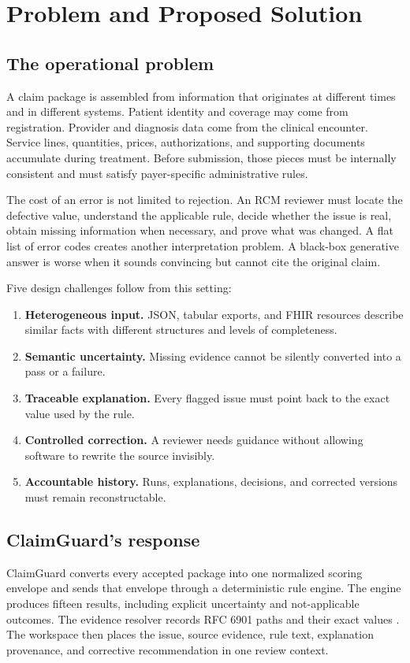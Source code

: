\documentclass[11pt,a4paper,oneside]{report}
\begin{document}
\chapter{Problem and Proposed Solution}

\section{The operational problem}
A claim package is assembled from information that originates at different times and in different systems. Patient identity and coverage may come from registration. Provider and diagnosis data come from the clinical encounter. Service lines, quantities, prices, authorizations, and supporting documents accumulate during treatment. Before submission, those pieces must be internally consistent and must satisfy payer-specific administrative rules.

The cost of an error is not limited to rejection. An RCM reviewer must locate the defective value, understand the applicable rule, decide whether the issue is real, obtain missing information when necessary, and prove what was changed. A flat list of error codes creates another interpretation problem. A black-box generative answer is worse when it sounds convincing but cannot cite the original claim.

Five design challenges follow from this setting:

\begin{enumerate}
  \item \textbf{Heterogeneous input.} JSON, tabular exports, and FHIR resources describe similar facts with different structures and levels of completeness.
  \item \textbf{Semantic uncertainty.} Missing evidence cannot be silently converted into a pass or a failure.
  \item \textbf{Traceable explanation.} Every flagged issue must point back to the exact value used by the rule.
  \item \textbf{Controlled correction.} A reviewer needs guidance without allowing software to rewrite the source invisibly.
  \item \textbf{Accountable history.} Runs, explanations, decisions, and corrected versions must remain reconstructable.
\end{enumerate}

\section{ClaimGuard's response}
ClaimGuard converts every accepted package into one normalized scoring envelope and sends that envelope through a deterministic rule engine. The engine produces fifteen results, including explicit uncertainty and not-applicable outcomes. The evidence resolver records RFC 6901 paths and their exact values \cite{rfc6901}. The workspace then places the issue, source evidence, rule text, explanation provenance, and corrective recommendation in one review context.
\end{document}
